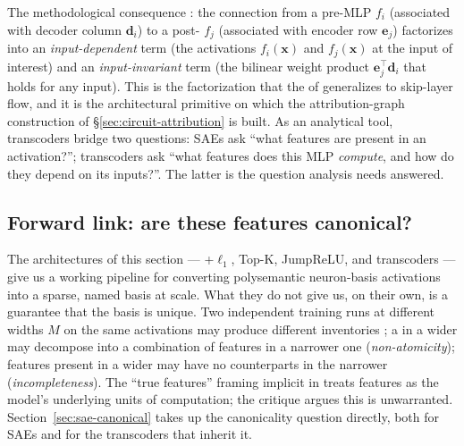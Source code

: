 The methodological consequence \citep[\S 1]{dunefsky2024-transcoders}:
the connection from a pre-MLP  $f_i$ (associated with decoder
column $\mathbf{d}_i$) to a post-  $f_j$ (associated
with encoder row $\mathbf{e}_j$) factorizes into an
\emph{input-dependent} term (the activations $f_i(\mathbf{x})$ and
$f_j(\mathbf{x})$ at the input of interest) and an \emph{input-invariant}
term (the bilinear weight product
$\mathbf{e}_j^\top\mathbf{d}_i$ that holds for any input). This is the
factorization that the  of
\citet{lindsey2025-circuit-tracing} generalizes to skip-layer 
flow, and it is the architectural primitive on which the
attribution-graph construction of \S\ref{sec:circuit-attribution} is
built. As an analytical tool, transcoders bridge two questions: SAEs
ask ``what features are present in an activation?''; transcoders ask
``what features does this MLP \emph{compute}, and how do they depend
on its inputs?''. The latter is the question  analysis needs
answered.

\subsection{Forward link: are these features canonical?}
\label{sec:sae-forward}

The architectures of this section --- +$\ell_1$, Top-K, JumpReLU,
and transcoders --- give us a working pipeline for converting
polysemantic neuron-basis activations into a sparse, named 
basis at scale. What they do not give us, on their own, is a guarantee
that the basis is unique. Two independent  training runs at
different widths $M$ on the same activations may produce different
 inventories \citep{leask2025-sae-not-canonical}; a  in
a wider  may decompose into a combination of features in a narrower
one (\emph{non-atomicity}); features present in a wider  may have no
counterparts in the narrower (\emph{incompleteness}). The
``true features'' framing implicit in
\citet{templeton2024-scaling-monosemanticity} treats  features as
the model's underlying units of computation; the
\citet{leask2025-sae-not-canonical} critique argues this is unwarranted.
Section~\ref{sec:sae-canonical} takes up the canonicality question
directly, both for SAEs and for the transcoders that inherit it.
